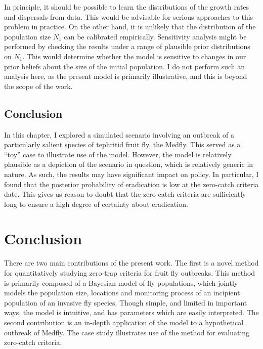 \documentclass[
  oneside]{book}
\begin{document}
In principle, it should be possible to learn the distributions of the growth rates and dispersals from data. This would be advisable for serious approaches to this problem in practice. On the other hand, it is unlikely that the distribution of the population size \(N_1\) can be calibrated empirically. Sensitivity analysis might be performed by checking the results under a range of plausible prior distributions on \(N_1\). This would determine whether the model is sensitive to changes in our prior beliefs about the size of the initial population. I do not perform such an analysis here, as the present model is primarily illustrative, and this is beyond the scope of the work.

\hypertarget{conclusion-2}{%
\section{Conclusion}\label{conclusion-2}}

In this chapter, I explored a simulated scenario involving an outbreak of a particularly salient species of tephritid fruit fly, the Medfly. This served as a ``toy'' case to illustrate use of the model. However, the model is relatively plausible as a depiction of the scenario in question, which is relatively generic in nature. As such, the results may have significant impact on policy. In particular, I found that the posterior probability of eradication is low at the zero-catch criteria date. This gives us reason to doubt that the zero-catch criteria are sufficiently long to ensure a high degree of certainty about eradication.

\hypertarget{conclusion-3}{%
\chapter{Conclusion}\label{conclusion-3}}

There are two main contributions of the present work. The first is a novel method for quantitatively studying zero-trap criteria for fruit fly outbreaks. This method is primarily composed of a Bayesian model of fly populations, which jointly models the population size, locations and monitoring process of an incipient population of an invasive fly species. Though simple, and limited in important ways, the model is intuitive, and has parameters which are easily interpreted. The second contribution is an in-depth application of the model to a hypothetical outbreak of Medfly. The case study illustrates use of the method for evaluating zero-catch criteria.
\end{document}
